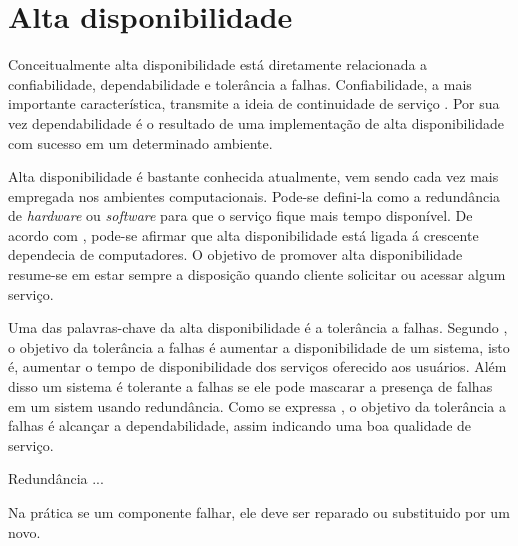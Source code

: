 \chapter{Alta disponibilidade}
Conceitualmente alta disponibilidade está diretamente relacionada a confiabilidade, dependabilidade e tolerância a falhas. 
Confiabilidade, a mais importante característica, transmite a ideia de continuidade de serviço \cite{pankaj1994}.
Por sua vez dependabilidade é o resultado de uma implementação de alta disponibilidade com sucesso em um determinado ambiente.

Alta disponibilidade é bastante conhecida atualmente, vem sendo cada vez mais empregada nos ambientes computacionais.
Pode-se defini-la como a redundância de \textit{hardware} ou \textit{software} para que o serviço fique mais tempo disponível.
De acordo com \cite{costa2009}, pode-se afirmar que alta disponibilidade está ligada á crescente dependecia de computadores.
O objetivo de promover alta disponibilidade resume-se em estar sempre a disposição quando cliente solicitar ou acessar algum serviço.

Uma das palavras-chave da alta disponibilidade é a tolerância a falhas.
Segundo \cite{pankaj1994}, o objetivo da tolerância a falhas é aumentar a disponibilidade de um sistema, isto é, 
aumentar o tempo de disponibilidade dos serviços oferecido aos usuários. Além disso um sistema é tolerante a falhas se ele pode
mascarar a presença de falhas em um sistem usando redundância. Como se expressa \cite{costa2009}, o objetivo da tolerância a falhas é 
alcançar a dependabilidade, assim indicando uma boa qualidade de serviço.

Redundância ...

Na prática se um componente falhar, ele deve ser reparado ou substituido por um novo.
